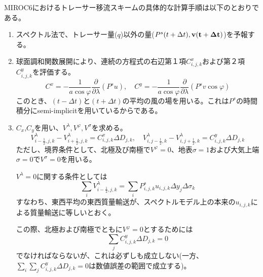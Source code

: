 \documentclass{jsbook}
\begin{document}
MIROC6におけるトレーサー移流スキームの具体的な計算手順は以下のとおりである。
\begin{enumerate}
\item スペクトル法で、トレーサー量($q$)以外の量($P^{s}(t+\Delta t), \bf{v}(t+\Delta t)$)を予報する。
\item 球面調和関数展開により、連続の方程式の右辺第１項$C^{x}_{i,j,k}$および第２項$C^{y}_{i,j,k}$を評価する。
  \begin{equation}
    C^{x}=-\frac{1}{a \cos \varphi}\frac{\partial}{\partial \lambda}(P^{s}u),\quad C^{y}=-\frac{1}{a \cos \varphi}\frac{\partial}{\partial \lambda}(P^{s}v \cos \varphi) 
  \end{equation}
  このとき、$(t-\Delta t)$と$(t+\Delta t)$の平均の風の場を用いる。これは$P^{s}$の時間積分にsemi-implicitを用いているからである。
\item $C_{x}$,$C_{y}$を用い、$V^{\lambda}, V^{\varphi}, V^{\sigma}$を求める。
  \begin{equation}
    V^{\lambda}_{i-\frac{1}{2},j,k}-V^{\lambda}_{i+\frac{1}{2},j,k}=C^{x}_{i,j,k}\Delta D_{j,k}, \quad V^{\lambda}_{i,j-\frac{1}{2},k}-V^{\lambda}_{i,j+\frac{1}{2},k}=C^{y}_{i,j,k}\Delta D_{j,k}
  \end{equation}
  ただし、境界条件として、北極及び南極で$V^{\varphi}=0$、地表$\sigma=1$および大気上端$\sigma=0$で$V^{\sigma}=0$を用いる。

  $V^{\lambda}=0$に関する条件としては
  \begin{equation}
    \sum_{i}V^{\lambda}_{i-\frac{1}{2},j,k}=\sum_{i}P^{s}_{i,j,k}u_{i,j,k}\Delta y_{j}\Delta \sigma_{k}
  \end{equation}
  すなわち、東西平均の東西質量輸送が、スペクトルモデル上の本来の$u_{i,j,k}$による質量輸送に等しいとおく。

  この際、北極および南極でともに$V^{\varphi}=0$とするためには
  \begin{equation}
    \sum_{j}C^{y}_{i,j,k}\Delta D_{j,k}=0
  \end{equation}
  でなければならないが、これは必ずしも成立しない(一方、$\sum_{i} \sum_{j}C^{y}_{i,j,k}\Delta D_{j,k}=0$は数値誤差の範囲で成立する)。


\end{enumerate}
\end{document}
